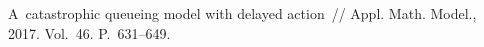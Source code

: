 \begin{multicols}{2}
{{\begin{thebibliography}{99}
 A~catastrophic queueing model
with delayed action~// Appl. Math. Model., 2017. Vol.~46. 
P.~631--649.















\end{thebibliography}}}
\end{multicols}
